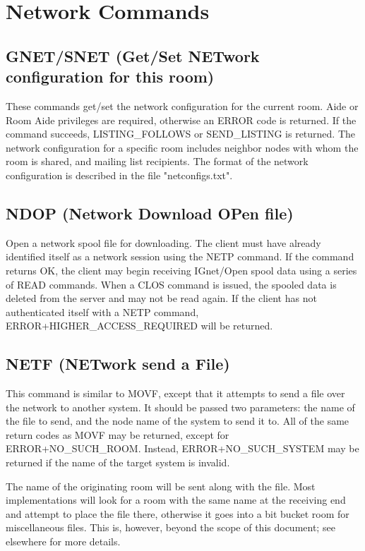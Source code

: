 \section{Network Commands}


\subsection{GNET/SNET (Get/Set NETwork configuration for this room)}

 These commands get/set the network configuration for the current room.  Aide
or Room Aide privileges are required, otherwise an ERROR code is returned.
If the command succeeds, LISTING_FOLLOWS or SEND_LISTING is returned.  The
network configuration for a specific room includes neighbor nodes with whom
the room is shared, and mailing list recipients.  The format of the network
configuration is described in the file "netconfigs.txt".



\subsection{NDOP (Network Download OPen file)}

 Open a network spool file for downloading.  The client must have already
identified itself as a network session using the NETP command.  If the command
returns OK, the client may begin receiving IGnet/Open spool data using
a series of READ commands.  When a CLOS command is issued, the spooled data
is deleted from the server and may not be read again.  If the client has not
authenticated itself with a NETP command, ERROR+HIGHER_ACCESS_REQUIRED will
be returned.



\subsection{NETF (NETwork send a File)}

 This command is similar to MOVF, except that it attempts to send a file over
the network to another system.  It should be passed two parameters: the name
of the file to send, and the node name of the system to send it to.  All of
the same return codes as MOVF may be returned, except for ERROR+NO_SUCH_ROOM.
Instead, ERROR+NO_SUCH_SYSTEM may be returned if the name of the target
system is invalid.

 The name of the originating room will be sent along with the file.  Most
implementations will look for a room with the same name at the receiving end
and attempt to place the file there, otherwise it goes into a bit bucket room
for miscellaneous files.  This is, however, beyond the scope of this document;
see elsewhere for more details.



